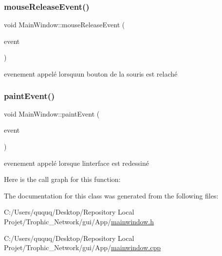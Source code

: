 \subsubsection{\texorpdfstring{mouse\+Release\+Event()}{mouseReleaseEvent()}}
{\footnotesize\ttfamily void Main\+Window\+::mouse\+Release\+Event (\begin{DoxyParamCaption}\item[{Q\+Mouse\+Event $\ast$}]{event }\end{DoxyParamCaption})\hspace{0.3cm}{\ttfamily [protected]}}



evenement appelé lorsqu\textquotesingle{}un bouton de la souris est relaché 

\mbox{\label{class_main_window_abf05d580e91f725777cdb6a5eb0bf08c}} 
\subsubsection{\texorpdfstring{paint\+Event()}{paintEvent()}}
{\footnotesize\ttfamily void Main\+Window\+::paint\+Event (\begin{DoxyParamCaption}\item[{Q\+Paint\+Event $\ast$}]{event }\end{DoxyParamCaption})\hspace{0.3cm}{\ttfamily [protected]}}



evenement appelé lorsque l\textquotesingle{}interface est redessiné 

Here is the call graph for this function\+:


The documentation for this class was generated from the following files\+:\begin{DoxyCompactItemize}
\item 
C\+:/\+Users/ququq/\+Desktop/\+Repository Local Projet/\+Trophic\+\_\+\+Network/gui/\+App/\mbox{\hyperlink{mainwindow_8h}{mainwindow.\+h}}\item 
C\+:/\+Users/ququq/\+Desktop/\+Repository Local Projet/\+Trophic\+\_\+\+Network/gui/\+App/\mbox{\hyperlink{mainwindow_8cpp}{mainwindow.\+cpp}}\end{DoxyCompactItemize}

